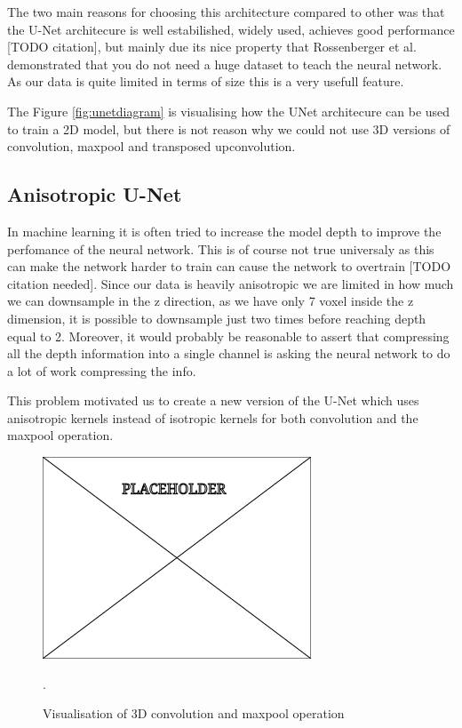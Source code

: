 \documentclass[
  digital,     %
  oneside,     %
  nosansbold,  %
  nocolorbold, %
  lof,         %
  lot,         %
]{fithesis4}
\begin{document}
The two main reasons for choosing this architecture compared to other was that
the U-Net architecure is well estabilished, widely used, achieves good
performance [TODO citation], but mainly due its nice property that Rossenberger
et al. \parencite{Ronneberger2015} demonstrated that you do not need a huge
dataset to teach the neural network. As our data is quite limited in terms of
size this is a very usefull feature.

The Figure \ref{fig:unetdiagram} is visualising how the UNet architecure can be
used to train a 2D model, but there is not reason why we could not use 3D
versions of convolution, maxpool and transposed upconvolution. 

\subsection{Anisotropic U-Net}

In machine learning it is often tried to increase the model depth to improve the
perfomance of the neural network. This is of course not true universaly as this
can make the network harder to train can cause the network to overtrain [TODO
citation needed]. Since our data is heavily anisotropic we are limited in how
much we can downsample in the z direction, as we have only 7 voxel inside the z
dimension, it is possible to downsample just two times before reaching depth
equal to 2. Moreover, it would probably be reasonable to assert that compressing
all the depth information into a single channel is asking the neural network to
do a lot of work compressing the info.

This problem motivated us to create a new version of the U-Net which uses
anisotropic kernels instead of isotropic kernels for both convolution and the
maxpool operation.

\begin{figure}
    \begin{center}
        \includegraphics[width=0.6\linewidth]{resources/placeholder.png}
    \end{center}
    \caption{Visualisation of 3D convolution and maxpool operation}.
    \label{fig:visanisooperations}
\end{figure}
\end{document}
